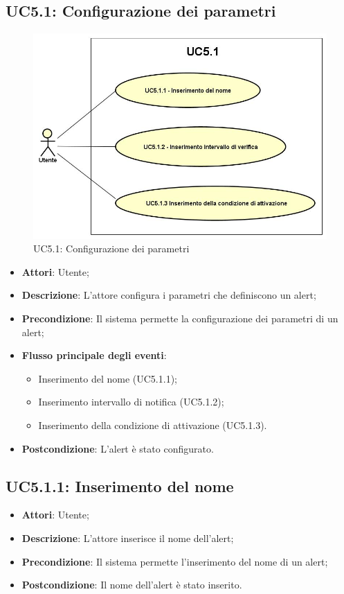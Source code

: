 \subsection{UC5.1: Configurazione dei parametri}
\begin{figure} [H]
	\centering
	\includegraphics[scale=0.45]{Img/UC5-1}
	\caption{UC5.1: Configurazione dei parametri}\label{}
\end{figure}
\begin{itemize}
	\item \textbf{Attori}: Utente;
	\item \textbf{Descrizione}: L'attore configura i parametri che definiscono un alert;
	\item \textbf{Precondizione}: Il sistema permette la configurazione dei parametri di un alert;
	\item \textbf{Flusso principale degli eventi}:
		\begin{itemize}
			\item Inserimento del nome (UC5.1.1);
			\item Inserimento intervallo di notifica (UC5.1.2);
			\item Inserimento della condizione di attivazione (UC5.1.3).
		\end{itemize}
	\item \textbf{Postcondizione}: L'alert è stato configurato.
\end{itemize}

\subsection{UC5.1.1: Inserimento del nome}
\begin{itemize}
	\item \textbf{Attori}: Utente;
	\item \textbf{Descrizione}: L'attore inserisce il nome dell'alert;
	\item \textbf{Precondizione}: Il sistema permette l'inserimento del nome di un alert;
	\item \textbf{Postcondizione}: Il nome dell'alert è stato inserito.
\end{itemize}

